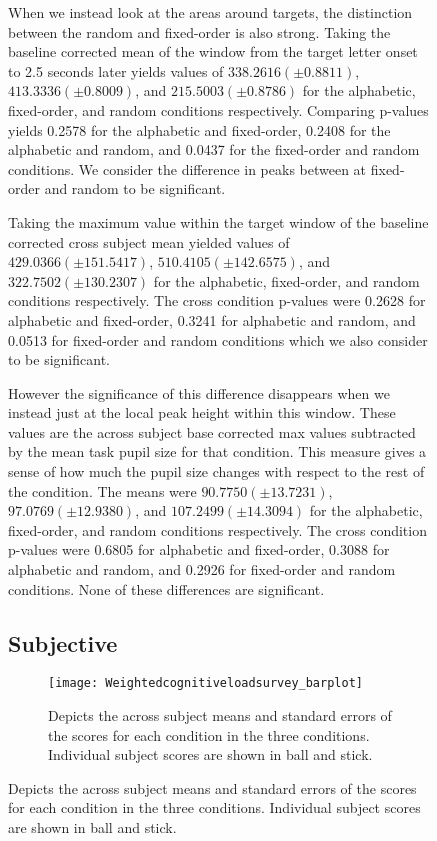 \documentclass[10pt]{article}
\begin{document}
\begin{figure}
When we instead look at the areas around targets, the distinction
between the random and fixed-order is also strong.  Taking
the baseline corrected mean of the window from the target letter
onset to 2.5 seconds later yields values of $338.2616 (\pm 0.8811)$,
$413.3336 (\pm 0.8009)$, and $215.5003 (\pm 0.8786)$ for the alphabetic,
fixed-order, and random conditions respectively.  Comparing p-values
yields 0.2578 for the alphabetic and fixed-order, 0.2408 for the
alphabetic and random, and 0.0437 for the fixed-order and random conditions.
We consider the difference in peaks between at fixed-order and
random to be significant.

Taking the maximum value within the target window of the baseline
corrected cross subject mean yielded  values of $429.0366 (\pm
151.5417)$, $510.4105 (\pm 142.6575)$, and $322.7502 (\pm 130.2307)$ for
the alphabetic, fixed-order, and random conditions respectively.
The cross condition p-values were 0.2628 for alphabetic and
fixed-order, 0.3241 for alphabetic and random, and 0.0513 for
fixed-order and random conditions which we also consider to be significant.

However the significance of this difference disappears when we
instead just at the local peak height within this window.  These
values are the across subject base corrected max values subtracted
by the mean task pupil size for that condition.  This measure gives
a sense of how much the pupil size changes with respect to the rest
of the condition. The means were $90.7750 (\pm 13.7231)$, $97.0769 (\pm
12.9380)$, and $107.2499 (\pm 14.3094)$ for the alphabetic,
fixed-order, and random conditions respectively.  The cross
condition p-values were 0.6805 for alphabetic and fixed-order,
0.3088 for alphabetic and random, and 0.2926 for fixed-order and
random conditions.  None of these differences are significant.


\subsection{Subjective}

\begin{figure}[t]
  \centering
  \texttt{[image: Weightedcognitiveloadsurvey\_barplot]}
  \caption{Depicts the across subject means and standard errors of
  the scores for each condition in the three conditions. Individual subject scores are shown in ball and stick.}
  \label{cogLoad}
\end{figure}


\end{figure}
\end{document}
